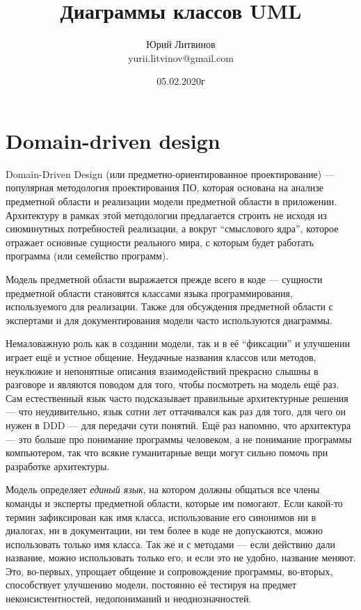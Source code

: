 \documentclass[a5paper]{article}
\title{Диаграммы классов UML}
\author{Юрий Литвинов\\\small{yurii.litvinov@gmail.com}}
\date{05.02.2020г}
\begin{document}
\maketitle
\thispagestyle{empty}

\section{Domain-driven design}

 Domain-Driven Design (или предметно-ориентированное проектирование) --- популярная методология проектирования ПО, которая основана на анализе предметной области и реализации модели предметной области в приложении. Архитектуру в рамках этой методологии предлагается строить не исходя из сиюминутных потребностей реализации, а вокруг ``смыслового ядра'', которое отражает основные сущности реального мира, с которым будет работать программа (или семейство программ).

Модель предметной области выражается прежде всего в коде --- сущности предметной области становятся классами языка программирования, используемого для реализации. Также для обсуждения предметной области с экспертами и для документирования модели часто используются диаграммы.

Немаловажную роль как в создании модели, так и в её ``фиксации'' и улучшении играет ещё и устное общение. Неудачные названия классов или методов, неуклюжие и непонятные описания взаимодействий прекрасно слышны в разговоре и являются поводом для того, чтобы посмотреть на модель ещё раз. Сам естественный язык часто подсказывает правильные архитектурные решения --- что неудивительно, язык сотни лет оттачивался как раз для того, для чего он нужен в DDD --- для передачи сути понятий. Ещё раз напомню, что архитектура --- это больше про понимание программы человеком, а не понимание программы компьютером, так что всякие гуманитарные вещи могут сильно помочь при разработке архитектуры.

Модель определяет \textit{единый язык}, на котором должны общаться все члены команды и эксперты предметной области, которые им помогают. Если какой-то термин зафиксирован как имя класса, использование его синонимов ни в диалогах, ни в документации, ни тем более в коде не допускаются, можно использовать только имя класса. Так же и с методами --- если действию дали название, можно использовать только его, и если это не удобно, название меняют. Это, во-первых, упрощает общение и сопровождение программы, во-вторых, способствует улучшению модели, постоянно её тестируя на предмет неконсистентностей, недопониманий и неоднозначностей.
\end{document}

